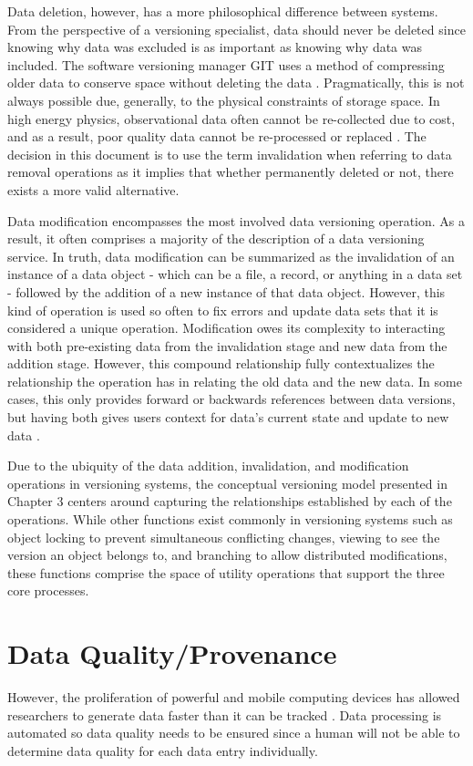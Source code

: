 Data deletion, however, has a more philosophical difference between systems.
From the perspective of a versioning specialist, data should never be deleted since knowing why data was excluded is as important as knowing why data was included.
The software versioning manager GIT uses a method of compressing older data to conserve space without deleting the data \cite{Chacon:2009:PG:1618548}.
Pragmatically, this is not always possible due, generally, to the physical constraints of storage space.
In high energy physics, observational data often cannot be re-collected due to cost, and as a result, poor quality data cannot be re-processed or replaced \cite{Cavanaugh2002}.
The decision in this document is to use the term invalidation when referring to data removal operations as it implies that whether permanently deleted or not, there exists a more valid alternative.

Data modification encompasses the most involved data versioning operation.
As a result, it often comprises a majority of the description of a data versioning service.
In truth, data modification can be summarized as the invalidation of an instance of a data object - which can be a file, a record, or anything in a data set - followed by the addition of a new instance of that data object.
However, this kind of operation is used so often to fix errors and update data sets that it is considered a unique operation.
Modification owes its complexity to interacting with both pre-existing data from the invalidation stage and new data from the addition stage.
However, this compound relationship fully contextualizes the relationship the operation has in relating the old data and the new data.
In some cases, this only provides forward or backwards references between data versions, but having both gives users context for data's current state and update to new data \cite{Klein01ontologyversioning}.

Due to the ubiquity of the data addition, invalidation, and modification operations in versioning systems, the conceptual versioning model presented in Chapter 3 centers around capturing the relationships established by each of the operations.
While other functions exist commonly in versioning systems such as object locking to prevent simultaneous conflicting changes, viewing to see the version an object belongs to, and branching to allow distributed modifications, these functions comprise the space of utility operations that support the three core processes.


\section{Data Quality/Provenance}
However, the proliferation of powerful and mobile computing devices has allowed researchers to generate data faster than it can be tracked \cite{Bose:2005:LRS:1057977.1057978}.
Data processing is automated so data quality needs to be ensured since a human will not be able to determine data quality for each data entry individually.

